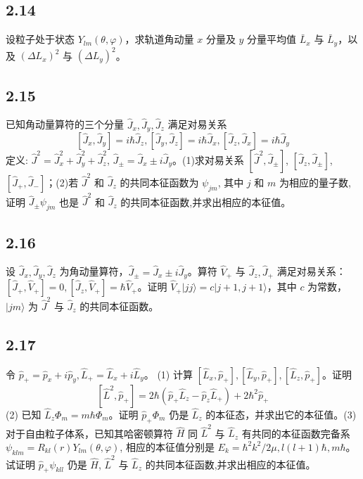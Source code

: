 \subsection{2.14}
设粒子处于状态 $Y_{lm}(\theta, \varphi)$，求轨道角动量 $x$ 分量及 $y$ 分量平均值 $\bar{L}_x$ 与 $\bar{L}_y$，以及 $(\Delta L_x)^2$ 与 $(\Delta L_y)^2$。

\subsection{2.15}
已知角动量算符的三个分量 $\hat{J}_x, \hat{J}_y, \hat{J}_z$ 满足对易关系 
$$[\hat{J}_x, \hat{J}_y] = i\hbar \hat{J}_z, [\hat{J}_y, \hat{J}_z] = i\hbar \hat{J}_x, [\hat{J}_z, \hat{J}_x] = i\hbar \hat{J}_y$$
定义: $\hat{J}^2 = \hat{J}_x^2 + \hat{J}_y^2 + \hat{J}_z^2$, $\hat{J}_{\pm} = \hat{J}_x \pm i \hat{J}_y$。(1)求对易关系 $[\hat{J}^2, \hat{J}_{\pm}]$, $[\hat{J}_z, \hat{J}_{\pm}]$, $[\hat{J}_+, \hat{J}_-]$；(2)若 $\hat{J}^2$ 和 $\hat{J}_z$ 的共同本征函数为 $\psi_{jm}$, 其中 $j$ 和 $m$ 为相应的量子数, 证明 $\hat{J}_{\pm} \psi_{jm}$ 也是 $\hat{J}^2$ 和 $\hat{J}_z$ 的共同本征函数,并求出相应的本征值。

\subsection{2.16}
设 $\hat{J}_x, \hat{J}_y, \hat{J}_z$ 为角动量算符，$\hat{J}_{\pm} = \hat{J}_x \pm i\hat{J}_y$。算符 $\hat{V}_+$ 与 $\hat{J}_z, \hat{J}_+$ 满足对易关系：$[\hat{J}_+, \hat{V}_+] = 0, [\hat{J}_z, \hat{V}_+] = \hbar \hat{V}_+$。证明 $\hat{V}_+ | j j \rangle = c | j + 1, j + 1 \rangle$，其中 $c$ 为常数，$|jm\rangle$ 为 $\hat{J}^2$ 与 $\hat{J}_z$ 的共同本征函数。

\subsection{2.17}
令 $\hat{p}_+ = \hat{p}_x + i \hat{p}_y, \hat{L}_+ = \hat{L}_x + i \hat{L}_y$。
(1) 计算 $[\hat{L}_x, \hat{p}_+], [\hat{L}_y, \hat{p}_+], [\hat{L}_z, \hat{p}_+]$。证明
$$[\hat{L}^2, \hat{p}_+] = 2 \hbar (\hat{p}_+ \hat{L}_z - \hat{p}_z \hat{L}_+ ) + 2 \hbar^2 \hat{p}_+$$
(2) 已知 $\hat{L}_z \Phi_m = m \hbar \Phi_m$。证明 $\hat{p}_+ \Phi_m$ 仍是 $\hat{L}_z$ 的本征态，并求出它的本征值。(3) 对于自由粒子体系，已知其哈密顿算符 $\hat{H}$ 同 $\hat{L}^2$ 与 $\hat{L}_z$ 有共同的本征函数完备系 $\psi_{klm} = R_{kl}(r) Y_{lm}(\theta, \varphi)$, 相应的本征值分别是 $E_k = \hbar^2 k^2 / 2\mu, l(l+1)\hbar, m\hbar$。试证明 $\hat{p}_+ \psi_{kll}$ 仍是 $\hat{H}$, $\hat{L}^2$ 与 $\hat{L}_z$ 的共同本征函数,并求出相应的本征值。

